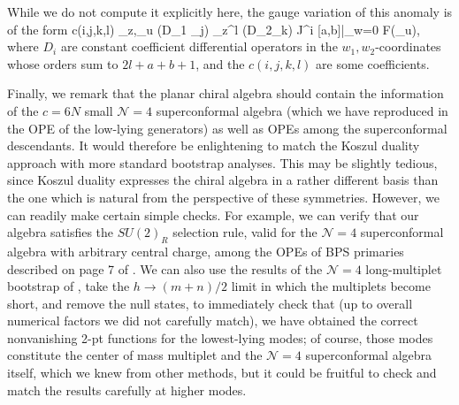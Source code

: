 \documentclass[../main.tex]{subfiles}
\begin{document}
While we do not compute it explicitly here, the gauge variation of this anomaly is of the form
\beqn
c(i,j,k,l)  \int_{z,\bfeta_u} \left(D_1 _j\right) \del_z^l \left(D_2\mu_k\right) \til J^i [a,b]|_{w=0} \wedge F(\bfeta_u),
\eeqn
where $D_i$ are constant coefficient differential operators in the $w_1,w_2$-coordinates whose orders sum to $2l + a + b + 1$, and the $c(i,j,k,l)$ are some coefficients.


Finally, we remark that the planar chiral algebra should contain the information of the $c=6N$ small $\mathcal{N}=4$ superconformal algebra (which we have reproduced in the OPE of the low-lying generators) as well as OPEs among the superconformal descendants. It would therefore be enlightening to match the Koszul duality approach with more standard bootstrap analyses. This may be slightly tedious, since Koszul duality expresses the chiral algebra in a rather different basis than the one which is natural from the perspective of these symmetries. However, we can readily make certain simple checks. For example, we can verify that our algebra satisfies the $SU(2)_R$ selection rule, valid for the $\mathcal{N}=4$ superconformal algebra with arbitrary central charge, among the OPEs of BPS primaries described on page 7 of \cite{Lin:2015wcg}. We can also use the results of the $\mathcal{N}=4$ long-multiplet bootstrap of \cite{Kos:2018glc}, take the $h \rightarrow (m+n)/2$ limit in which the multiplets become short, and remove the null states, to immediately check that (up to overall numerical factors we did not carefully match), we have obtained the correct nonvanishing 2-pt functions for the lowest-lying modes; of course, those modes constitute the center of mass multiplet and the $\mathcal{N}=4$ superconformal algebra itself, which we knew from other methods, but it could be fruitful to check and match the results carefully at higher modes. 
\end{document}
